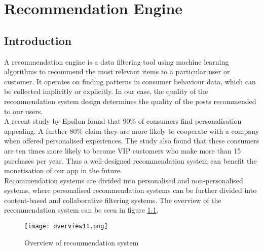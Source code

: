 
\chapter{Recommendation Engine}%
\label{Chapter6} %

\section{Introduction}
A recommendation engine is a data filtering tool using machine learning algorithms to recommend the most relevant items to a particular user or customer. 
It operates on finding patterns in consumer behaviour data, which can be collected implicitly or explicitly.\footfullcite{} In our case, the quality of the recommendation system design determines the quality of the posts recommended to our users.
\\A recent study by Epsilon found that 90\% of consumers find personalisation appealing. A further 80\% claim they are more likely to cooperate with a company when offered personalised experiences.
The study also found that these consumers are ten times more likely to become VIP customers who make more than 15 purchases per year. 
Thus a well-designed recommendation system can benefit the monetisation of our app in the future.
\\Recommendation systems are divided into personalised and non-personalised systems, where personalised recommendation systems can be further divided into content-based and collaborative filtering systems. 
The overview of the recommendation system can be seen in figure \ref{fig:overrecomm}.
\begin{figure}[ht]
\centering
\texttt{[image: overview11.png]}
\caption{Overview of recommendation system}
\label{fig:overrecomm}
\end{figure}

